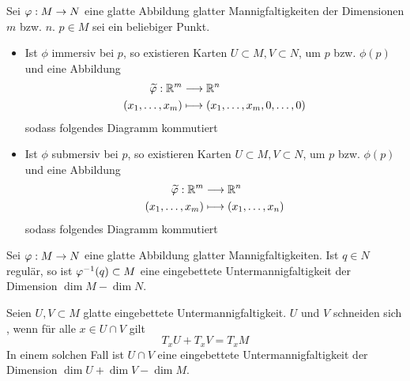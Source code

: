 \Prop{}
Sei $\varphi : M \overset{}{\rightarrow} N$ eine glatte Abbildung glatter Mannigfaltigkeiten der Dimensionen $m$ bzw. $n$. $p\in M$ sei ein beliebiger Punkt.
\begin{itemize}
	\item Ist $\phi$ immersiv bei $p$, so existieren Karten $U\subset M, V\subset N$, um $p$ bzw. $\phi(p)$ und eine Abbildung
	\begin{align*}
	\widetilde{\varphi} : \mathbb{R}^m& \overset{}{\longrightarrow} \mathbb{R}^n\\
	(x_1,\ldots, x_m) & \longmapsto (x_1,\ldots, x_m, 0,\ldots, 0)
	\end{align*}
	sodass folgendes Diagramm kommutiert
	\begin{center}
	\end{center}
	\item Ist $\phi$ submersiv bei $p$, so existieren Karten $U\subset M, V\subset N$, um $p$ bzw. $\phi(p)$ und eine Abbildung
\begin{align*}
\widetilde{\varphi} : \mathbb{R}^m& \overset{}{\longrightarrow} \mathbb{R}^n\\
(x_1,\ldots, x_m) & \longmapsto (x_1,\ldots, x_n)
\end{align*}
sodass folgendes Diagramm kommutiert
\begin{center}
\end{center}
\end{itemize}

\Kor{}
Sei $\varphi : M\overset{}{\rightarrow} N$ eine glatte Abbildung glatter Mannigfaltigkeiten. Ist $q\in N$ regulär, so ist $\varphi^{-1}(q)\subset M$ eine eingebettete Untermannigfaltigkeit der Dimension $\dim M - \dim N$.

\Satz{}
Seien $U,V \subset M$ glatte eingebettete Untermannigfaltigkeit. $U$ und $V$ schneiden sich , wenn für alle $x\in U\cap V$ gilt
\[ T_xU +T_xV = T_xM \]
In einem solchen Fall ist $U\cap V$ eine eingebettete Untermannigfaltigkeit der Dimension $\dim U + \dim V - \dim M$.

